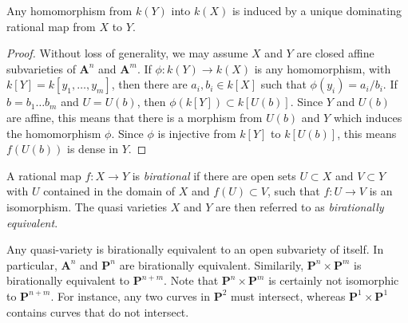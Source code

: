 \begin{theorem}
    Any homomorphism from $k(Y)$ into $k(X)$ is induced by a unique dominating rational map from $X$ to $Y$.
\end{theorem}
\begin{proof}
    Without loss of generality, we may assume $X$ and $Y$ are closed affine subvarieties of $\mathbf{A}^n$ and $\mathbf{A}^m$. If $\phi: k(Y) \to k(X)$ is any homomorphism, with $k[Y] = k[y_1,\dots,y_m]$, then there are $a_i,b_i \in k[X]$ such that $\phi(y_i) = a_i/b_i$. If $b = b_1 \dots b_m$ and $U = U(b)$, then $\phi(k[Y]) \subset k[U(b)]$. Since $Y$ and $U(b)$ are affine, this means that there is a morphism from $U(b)$ and $Y$ which induces the homomorphism $\phi$. Since $\phi$ is injective from $k[Y]$ to $k[U(b)]$, this means $f(U(b))$ is dense in $Y$.
\end{proof}

A rational map $f: X \to Y$ is \emph{birational} if there are open sets $U \subset X$ and $V \subset Y$ with $U$ contained in the domain of $X$ and $f(U) \subset V$, such that $f: U \to V$ is an isomorphism. The quasi varieties $X$ and $Y$ are then referred to as \emph{birationally equivalent}.

\begin{example}
    Any quasi-variety is birationally equivalent to an open subvariety of itself. In particular, $\mathbf{A}^n$ and $\mathbf{P}^n$ are birationally equivalent. Similarily, $\mathbf{P}^n \times \mathbf{P}^m$ is birationally equivalent to $\mathbf{P}^{n+m}$. Note that $\mathbf{P}^n \times \mathbf{P}^m$ is certainly not isomorphic to $\mathbf{P}^{n+m}$. For instance, any two curves in $\mathbf{P}^2$ must intersect, whereas $\mathbf{P}^1 \times \mathbf{P}^1$ contains curves that do not intersect.
\end{example}

